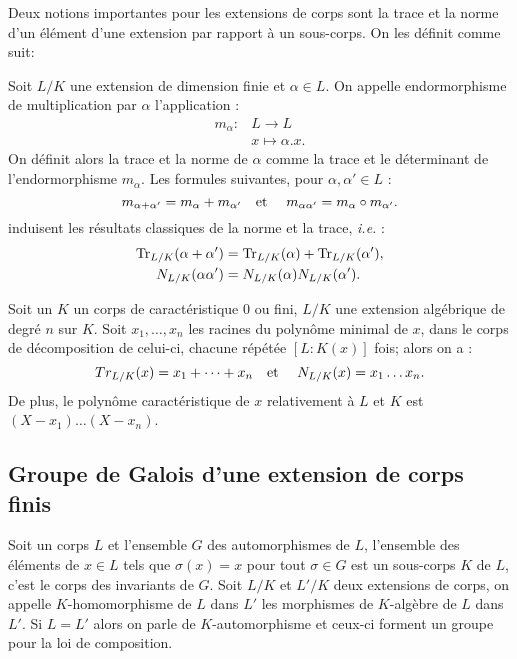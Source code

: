 \documentclass[a4paper]{article} %
\numberwithin{section}{part}
\numberwithin{equation}{section}
\newcommand\etmath{\textup{\quad et \quad}}
\begin{document}

Deux notions importantes pour les extensions de corps sont la trace et la norme
d'un élément d'une extension par rapport à un sous-corps. On les définit comme
suit:

\begin{defn}
Soit $L/K$ une extension de dimension finie et $\alpha\in L$. On appelle
endormorphisme de multiplication par $\alpha$ l'application :
\begin{align*}
m_{\alpha} :&L \longrightarrow L\\
&x\longmapsto\alpha.x.
\end{align*}
On définit alors la trace et la norme de $\alpha$ comme la trace et le 
déterminant de l'endormorphisme $m_{\alpha}$. Les formules suivantes, pour 
$\alpha, \alpha'\in L$ :
\begin{equation}
m_{\alpha + \alpha'} = m_{\alpha} + m_{\alpha'} \etmath
m_{\alpha\alpha'} = m_{\alpha}\circ m_{\alpha'}. 
\end{equation}
induisent les résultats classiques de la norme et la trace, \textit{i.e.} :
\begin{align}
\textup{Tr}_{L/K}(\alpha + \alpha') &= \textup{Tr}_{L/K}(\alpha) +
\textup{Tr}_{L/K}(\alpha'),\\
N_{L/K}(\alpha\alpha') &= N_{L/K}(\alpha)N_{L/K}(\alpha').
\end{align}
\end{defn}

\begin{prop}
Soit un $K$ un corps de caractéristique 0 ou fini, $L/K$ une extension
algébrique de degré $n$ sur $K$. Soit 
$x_1,\dots, x_n$ les racines du polynôme minimal de $x$, dans le corps de
décomposition de celui-ci, chacune répétée $[L:K(x)]$ fois; alors on a :
\begin{equation}
Tr_{L/K}(x) = x_1 + \dots + x_n \etmath N_{L/K}(x) = x_1\dots x_n.
\end{equation}
De plus, le polynôme caractéristique de $x$ relativement à $L$ et $K$ est $(X -
x_1)\dots(X - x_n)$.
\end{prop}

\subsection{Groupe de Galois d'une extension de corps finis}
Soit un corps $L$ et l'ensemble $G$ des automorphismes de $L$, l'ensemble des
éléments de $x\in L$ tels que $\sigma(x) = x$ pour tout $\sigma\in G$ est un
sous-corps $K$ de $L$, c'est le corps des invariants de $G$. Soit $L/K$ et
$L'/K$ deux extensions de corps, on appelle $K$-homomorphisme de $L$ dans $L'$ 
les morphismes de $K$-algèbre de $L$ dans $L'$. Si $L = L'$ alors on parle de
$K$-automorphisme et ceux-ci forment un groupe pour la loi de composition.
\end{document}
